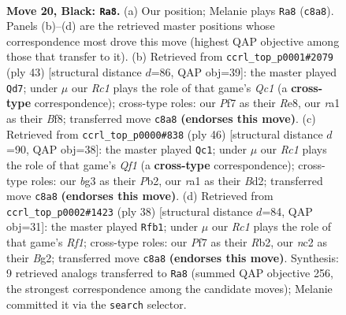 \documentclass[11pt]{article}
\begin{document}
\clearpage

\begin{figure}[p]\centering
\begin{subfigure}{0.46\textwidth}\centering
\resizebox{\linewidth}{!}{%
\newchessgame
\chessboard[
  setfen={2r3k1/pp3pbp/1nn2qp1/3p1b2/3P4/1B4BP/PPN1QPP1/RN4K1 b - - 6 20},
  showmover=false,
  pgfstyle=straightmove, color=movearrow, markmove={c8-a8}
]}
\caption{}
\end{subfigure}\hfill
\begin{subfigure}{0.46\textwidth}\centering
\resizebox{\linewidth}{!}{%
\newchessgame
\chessboard[
  setfen={2q1rbk1/2p2pp1/2b1nn1p/1p2p3/1P2P3/1NPBB2P/3NQPP1/R5K1 b - - 5 22},
  showmover=false,
  pgfstyle=straightmove, color=movearrow, markmove={c8-d7}
]}
\caption{}
\end{subfigure}
\\[4pt]
\begin{subfigure}{0.46\textwidth}\centering
\resizebox{\linewidth}{!}{%
\newchessgame
\chessboard[
  setfen={3q1bk1/r4p2/p2p1npp/P1pP1b2/2B5/R1N4P/1P1B1PP1/5QK1 w - - 3 24},
  showmover=false,
  pgfstyle=straightmove, color=movearrow, markmove={f1-c1}
]}
\caption{}
\end{subfigure}\hfill
\begin{subfigure}{0.46\textwidth}\centering
\resizebox{\linewidth}{!}{%
\newchessgame
\chessboard[
  setfen={r3rbk1/2q1npp1/2ppb2p/4p3/2P5/3P1NPP/1RQBPPB1/5RK1 w - - 2 20},
  showmover=false,
  pgfstyle=straightmove, color=movearrow, markmove={f1-b1}
]}
\caption{}
\end{subfigure}
\caption{\textbf{Move 20, Black: \texttt{Ra8}.} (a) Our position; Melanie plays \texttt{Ra8} (\texttt{c8a8}). Panels (b)--(d) are the retrieved master positions whose correspondence most drove this move (highest QAP objective among those that transfer to it). (b) Retrieved from \texttt{ccrl\_top\_p0001\#2079} (ply 43) [structural distance $d$=86, QAP obj=39]: the master played \texttt{Qd7}; under $\mu$ our \emph{Rc1} plays the role of that game's \emph{Qc1} (a \textbf{cross-type} correspondence); cross-type roles: our \emph{P}f7 as their \emph{R}e8, our \emph{r}a1 as their \emph{B}f8; transferred move \texttt{c8a8} \textbf{(endorses this move)}. (c) Retrieved from \texttt{ccrl\_top\_p0000\#838} (ply 46) [structural distance $d$=90, QAP obj=38]: the master played \texttt{Qc1}; under $\mu$ our \emph{Rc1} plays the role of that game's \emph{Qf1} (a \textbf{cross-type} correspondence); cross-type roles: our \emph{b}g3 as their \emph{P}b2, our \emph{r}a1 as their \emph{B}d2; transferred move \texttt{c8a8} \textbf{(endorses this move)}. (d) Retrieved from \texttt{ccrl\_top\_p0002\#1423} (ply 38) [structural distance $d$=84, QAP obj=31]: the master played \texttt{Rfb1}; under $\mu$ our \emph{Rc1} plays the role of that game's \emph{Rf1}; cross-type roles: our \emph{P}f7 as their \emph{R}b2, our \emph{n}c2 as their \emph{B}g2; transferred move \texttt{c8a8} \textbf{(endorses this move)}. Synthesis: 9 retrieved analogs transferred to \texttt{Ra8} (summed QAP objective 256, the strongest correspondence among the candidate moves); Melanie committed it via the \texttt{search} selector.}
\label{fig:thought-m39}
\end{figure}
\end{document}
